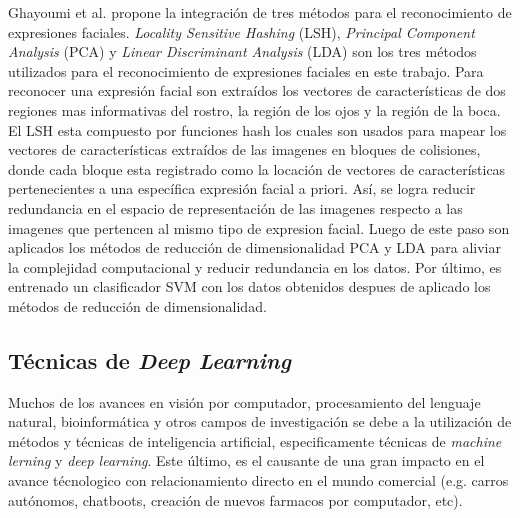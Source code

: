 \begin{enumerate}
{Ghayoumi et al.  propone la integración de tres métodos para el reconocimiento de expresiones faciales. \textit{Locality Sensitive Hashing} (LSH), \textit{Principal Component Analysis} (PCA) y \textit{Linear Discriminant Analysis} (LDA)  son los tres métodos utilizados para el reconocimiento de expresiones faciales en este trabajo. Para reconocer una expresión facial son extraídos los vectores de características de dos regiones mas informativas del rostro, la región de los ojos y la región de la boca. El LSH esta compuesto por funciones hash los cuales son usados para mapear los vectores de características extraídos de las imagenes en bloques de colisiones, donde cada bloque esta registrado como la locación de vectores de características pertenecientes a una específica expresión facial a priori. Así, se logra reducir redundancia en el espacio de representación de las imagenes respecto a las imagenes que pertencen al mismo tipo de expresion facial. Luego de este paso son aplicados los métodos de reducción de dimensionalidad PCA y LDA  para aliviar la complejidad computacional y reducir redundancia en los datos. Por último, es entrenado un clasificador SVM con los datos obtenidos despues de aplicado los métodos de reducción de dimensionalidad.
}

\end{enumerate}

\subsection{Técnicas de \textit{Deep Learning}}

Muchos de los avances en visión por computador, procesamiento del lenguaje natural, bioinformática y otros campos de investigación se debe a la utilización de métodos y técnicas de inteligencia artificial, especificamente técnicas de \textit{machine lerning} y \textit{deep learning}. Este último, es el causante de una gran impacto en el avance técnologico con relacionamiento directo en el mundo comercial (e.g. carros autónomos, chatboots, creación de nuevos farmacos por computador, etc). 


